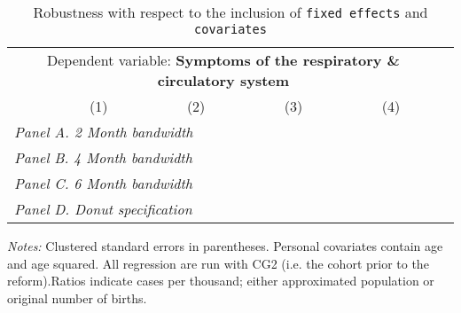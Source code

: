  \begin{table}[H] \begin{threeparttable} \centering \caption{Robustness with respect to the inclusion of \texttt{fixed effects} and \texttt{covariates}} {\def\sym#1{\ifmmode^{#1}\else\(^{#1}\)\fi} \begin{tabular}{l*{5}{c}} \toprule \multicolumn{5}{c}{Dependent variable: \textbf{Symptoms of the respiratory \& circulatory system}} \\ \cmidrule(lr){2-5}
            &\multicolumn{1}{c}{(1)}&\multicolumn{1}{c}{(2)}&\multicolumn{1}{c}{(3)}&\multicolumn{1}{c}{(4)}\\
\midrule
 \multicolumn{5}{l}{\emph{Panel A. 2 Month bandwidth}} \\    \midrule\multicolumn{5}{l}{\emph{Panel B. 4 Month bandwidth}} \\    \midrule\multicolumn{5}{l}{\emph{Panel C. 6 Month bandwidth}} \\    \midrule\multicolumn{5}{l}{\emph{Panel D. Donut specification}} \\    \midrule  
\bottomrule \end{tabular} } \begin{tablenotes} \item \scriptsize \emph{Notes:} Clustered standard errors in parentheses. Personal covariates contain age and age squared. All regression are run with CG2 (i.e. the cohort prior to the reform).Ratios indicate cases per thousand; either approximated population or original number of births. \end{tablenotes} \end{threeparttable} \end{table} 
